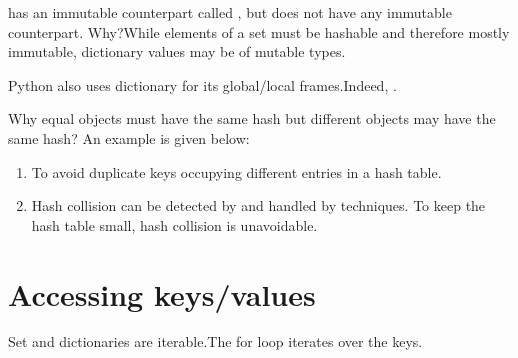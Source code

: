 \documentclass[letterpaper,10pt,english]{sphinxmanual}
\begin{document}
 has an immutable counterpart called , but  does not have any immutable counterpart. Why?While elements of a set must be hashable and therefore mostly immutable, dictionary values may be of mutable types.

Python also uses dictionary for its global/local frames.Indeed, .

 Why equal objects must have the same hash but different objects may have the same hash? An example is given below:

\begin{sphinxVerbatim}[commandchars=\\\{\}]
             
\end{sphinxVerbatim}
\begin{enumerate}
%
\item {} 
To avoid duplicate keys occupying different entries in a hash table.

\item {} 
Hash collision can be detected by \sphinxcode{\sphinxupquote{==}} and handled by  techniques. To keep the hash table small, hash collision is unavoidable.

\end{enumerate}


\section{Accessing keys/values}
\label{\detokenize{Lecture8/Dictionaries and Sets:accessing-keys-values}}

Set and dictionaries are iterable.The for loop iterates over the keys.
\end{document}
